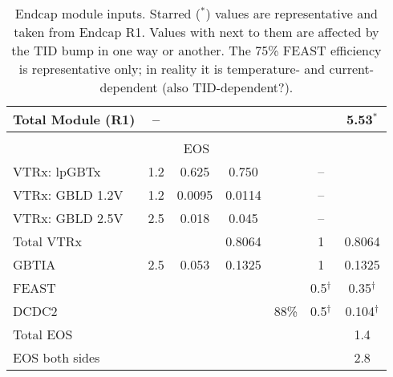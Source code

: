 \begin{table}[h]
\begin{center}
{\begin{tabular}{|l|c|c|c|c|c|c|}
Total Module (R1)  & --       &                       &                             &       &                     & 5.53$^*$        \\ \hline
\multicolumn{7}{|c|}{} \\[-2mm]
\multicolumn{7}{|c|}{EOS} \\ \hline
VTRx: lpGBTx  & 1.2           & 0.625                 & 0.750                       &       & --                  &                 \\
VTRx: GBLD 1.2V & 1.2         & 0.0095                & 0.0114                      &       & --                  &                 \\
VTRx: GBLD 2.5V & 2.5         & 0.018                 & 0.045                       &       & --                  &                 \\
Total VTRx    &               &                       & 0.8064                      &       & 1                   & 0.8064          \\         
GBTIA         & 2.5           & 0.053                 & 0.1325                      &       & 1                   & 0.1325          \\
FEAST         &               &                       &                             &       & 0.5$^\dagger$       & 0.35$^\dagger$  \\
DCDC2         &               &                       &                             & 88\%  & 0.5$^\dagger$       & 0.104$^\dagger$ \\ \hline
Total EOS     &               &                       &                             &       &                     & 1.4             \\
EOS both sides&               &                       &                             &       &                     & 2.8             \\
\hline \end{tabular}
} %
\end{center}
\caption{Endcap module inputs. Starred ($^*$) values are representative and taken from Endcap R1. Values
with \tid next to them are affected by the TID bump in one way or another. The 75\% FEAST efficiency 
is representative only; in reality it is temperature- and current-dependent (also TID-dependent?).
}
\label{tab:power_numbers}
\end{table}
\let\arraystretch\arraystretcha

